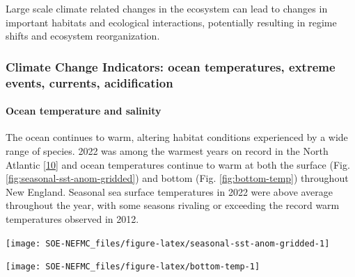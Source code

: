 \documentclass[
  10pt,
]{article}
\let\origfigure\figure
\let\endorigfigure\endfigure
\renewenvironment{figure}[1][2] {
    \expandafter\origfigure\expandafter[H]
} {
    \endorigfigure
}
\begin{document}
Large scale climate related changes in the ecosystem can lead to changes in important habitats and ecological interactions, potentially resulting in regime shifts and ecosystem reorganization.

\hypertarget{climate-change-indicators-ocean-temperatures-extreme-events-currents-acidification}{%
\subsubsection{Climate Change Indicators: ocean temperatures, extreme events, currents, acidification}\label{climate-change-indicators-ocean-temperatures-extreme-events-currents-acidification}}

\hypertarget{ocean-temperature-and-salinity}{%
\paragraph{Ocean temperature and salinity}\label{ocean-temperature-and-salinity}}

The ocean continues to warm, altering habitat conditions experienced by a wide range of species. 2022 was among the warmest years on record in the North Atlantic {[}\protect\hyperlink{ref-cheng_another_2023}{10}{]} and ocean temperatures continue to warm at both the surface (Fig. \ref{fig:seasonal-sst-anom-gridded}) and bottom (Fig. \ref{fig:bottom-temp}) throughout New England. Seasonal sea surface temperatures in 2022 were above average throughout the year, with some seasons rivaling or exceeding the record warm temperatures observed in 2012.

\begin{figure}

{\centering \texttt{[image: SOE-NEFMC\_files/figure-latex/seasonal-sst-anom-gridded-1]} 

}

\caption{New England (EPUs outlined in grey) 2022 seasonal sea surface temperature (SST) anomalies. The anomalies are the difference between the 2022 seasonal means and the long-term (1991-2020) seasonal means.  Seasons are defined as: Jan-Mar for winter, Apr-Jun for spring, Jul-Sep for summer, and Oct-Dec for fall.}\label{fig:seasonal-sst-anom-gridded}
\end{figure}

\begin{figure}

{\centering \texttt{[image: SOE-NEFMC\_files/figure-latex/bottom-temp-1]} 

}

\caption{Annual Georges Bank and Gulf of Maine seasonal bottom temperature anomalies. Data are obtained from GLORYS, a global ocean reanalysis product that provides high resolution data on ocean physics and incorporates real-time observations.  Data from the last two years (open circles) are from a near-real-time model (PSY) and are considered preliminary.}\label{fig:bottom-temp}
\end{figure}
\end{document}
